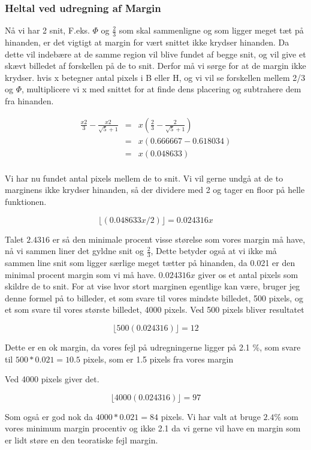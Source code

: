 \subsubsection{Heltal ved udregning af Margin}
Nå vi har 2 snit, F.eks. $\varPhi$ og $\frac{2}{3}$ som skal sammenligne og
som ligger meget tæt på hinanden, er det vigtigt at margin for vært
snittet ikke krydser hinanden. Da dette vil indebære at de samme region
vil blive fundet af begge snit, og vil give et skævt billedet af
forskellen på de to snit. Derfor må vi sørge for at de margin ikke
krydser. hvis x betegner antal pixels i B eller H, og vi vil se
forskellen mellem 2/3 og $\varPhi$, multiplicere vi x med snittet for at
finde dens placering og subtrahere dem fra hinanden.

\begin{eqnarray}
	\frac{x2}{3}-\frac{x2}{\sqrt{5}+1} &=& x(\frac{2}{3}-\frac{2}{\sqrt{5}+1}) \\ \nonumber
	&=& x(0.666667-0.618034) \\ \nonumber
	&=& x(0.048633) \\
\end{eqnarray}

Vi har nu fundet antal pixels mellem de to snit. Vi vil gerne undgå at
de to marginens ikke krydser hinanden, så der dividere med 2 og tager en
floor på helle funktionen.

\begin{equation}
	\lfloor(0.048633x/2)\rfloor = 0.024316x
\end{equation}

Talet $2.4316$ er så den minimale procent visse størelse som vores
margin må have, nå vi sammen liner det gyldne snit og $\frac{2}{3}$,
Dette betyder også at vi ikke må sammen line snit som ligger særlige
meget tætter på hinanden, da 0.021 er den minimal procent margin som vi må have.
$0.024316x$ giver os et antal pixels som skildre de to snit. For at vise
hvor stort marginen egentlige kan være, bruger jeg denne formel på to
billeder, et som svare til vores mindste billedet, 500 pixels, og et
som svare til vores største billedet, 4000 pixels. Ved 500 pixels
bliver resultatet

\begin{equation}
	 \lfloor 500(0.024316)\rfloor = 12
\end{equation}

Dette er en ok margin, da vores fejl på udregningerne ligger på 2.1 \%,
som svare til $500*0.021 = 10.5$ pixels, som er 1.5 pixels fra vores
margin

Ved 4000 pixels giver det.

\begin{equation}
	 \lfloor 4000(0.024316)\rfloor = 97
\end{equation}

Som også er god nok da $4000*0.021 = 84$ pixels. Vi har valt at bruge
$2.4\%$ som vores minimum margin procentiv og ikke 2.1 da vi gerne
vil have en margin som er lidt støre en den teoratiske fejl margin.
\label{margin}
